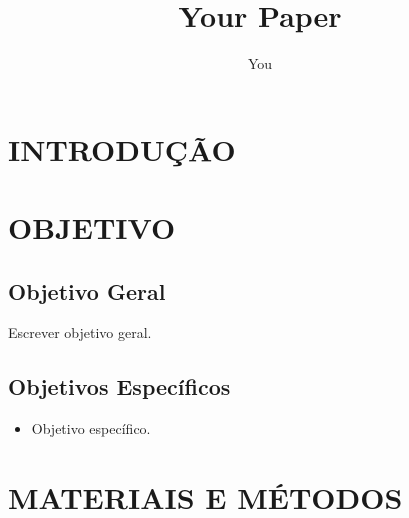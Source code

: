 \documentclass[12pt]{article}
\title{Your Paper}
\author{You}
\begin{document}




\newpage



\newpage




\newpage
\pagestyle{empty}
\tableofcontents
\clearpage
\pagestyle{fancy}


\section{\normalsize{INTRODUÇÃO}}
\vspace{3mm}


\newpage


\section{\normalsize{OBJETIVO}}

\subsection{Objetivo Geral}

Escrever objetivo geral.

\subsection{Objetivos Específicos
}
\begin{itemize}
    \item Objetivo específico.
\end{itemize}

\newpage


\section{\normalsize{MATERIAIS E MÉTODOS}}
\vspace{3mm}

\end{document}
